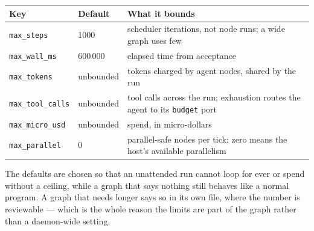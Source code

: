 \begin{center}
\footnotesize
\begin{tabular}{@{}p{}p{}p{}@{}}
	\toprule
	\textbf{Key} & \textbf{Default} & \textbf{What it bounds} \\
	\midrule
	\texttt{max\_steps} & 1000 & scheduler iterations, not node runs; a wide graph uses few \\
	\texttt{max\_wall\_ms} & 600\,000 & elapsed time from acceptance \\
	\texttt{max\_tokens} & unbounded & tokens charged by agent nodes, shared by the run \\
	\texttt{max\_tool\_calls} & unbounded & tool calls across the run; exhaustion routes the agent
	to its \texttt{budget} port \\
	\texttt{max\_micro\_usd} & unbounded & spend, in micro-dollars \\
	\texttt{max\_parallel} & 0 & parallel-safe nodes per tick; zero means the host's available
	parallelism \\
	\bottomrule
\end{tabular}
\end{center}

The defaults are chosen so that an unattended run cannot loop for ever or spend without a ceiling,
while a graph that says nothing still behaves like a normal program. A graph that needs longer says
so in its own file, where the number is reviewable --- which is the whole reason the limits are part
of the graph rather than a daemon-wide setting.
